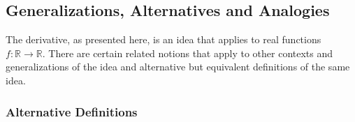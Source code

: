 %
%






\subsection{Generalizations, Alternatives and Analogies}
The derivative, as presented here, is an idea that applies to real functions $f: \mathbb{R} \rightarrow \mathbb{R}$. There are certain related notions that apply to other contexts and generalizations of the idea and alternative but equivalent definitions of the same idea.

\subsubsection{Alternative Definitions}

